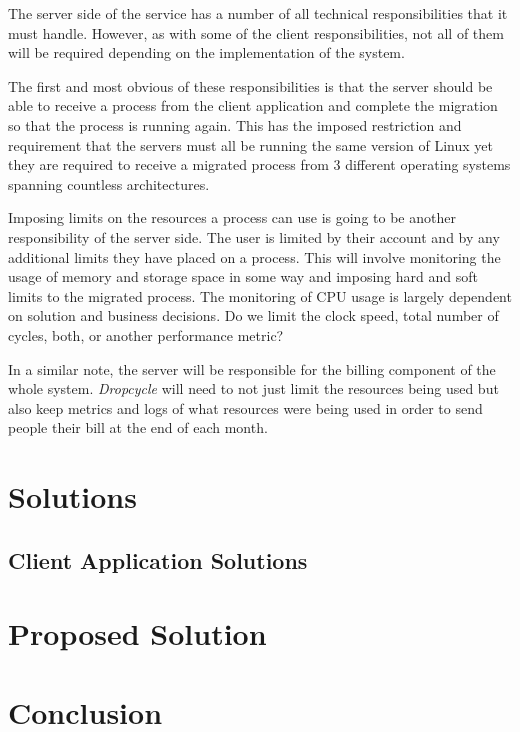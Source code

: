 \documentclass[12pt, a4paper]{article}
\begin{document}
The server side of the service has a number of all technical responsibilities
that it must handle. However, as with some of the client responsibilities, not
all of them will be required depending on the implementation of the system.

The first and most obvious of these responsibilities is that the server should
be able to receive a process from the client application and complete the
migration so that the process is running again. This has the imposed
restriction and requirement that the servers must all be running the same
version of Linux yet they are required to receive a migrated process from
3 different operating systems spanning countless architectures.

Imposing limits on the resources a process can use is going to be another
responsibility of the server side. The user is limited by their account and by
any additional limits they have placed on a process. This will involve
monitoring the usage of memory and storage space in some way and imposing hard
and soft limits to the migrated process. The monitoring of CPU usage is largely
dependent on solution and business decisions. Do we limit the clock speed,
total number of cycles, both, or another performance metric?

In a similar note, the server will be responsible for the billing component of
the whole system. \emph{Dropcycle} will need to not just limit the resources
being used but also keep metrics and logs of what resources were being used in
order to send people their bill at the end of each month.


\section{Solutions}

\subsection{Client Application Solutions}

\section{Proposed Solution}

\section{Conclusion}
\end{document}
